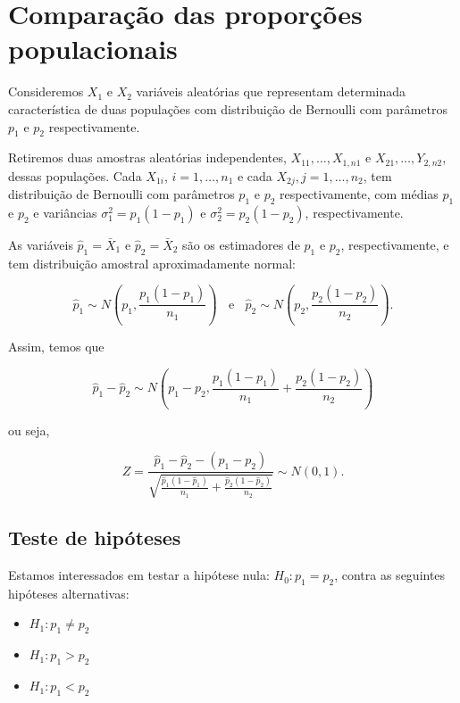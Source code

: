 \documentclass[
]{book}
\providecommand{\tightlist}{%
  \setlength{\itemsep}{0pt}\setlength{\parskip}{0pt}}
\begin{document}
\hypertarget{comparauxe7uxe3o-das-proporuxe7uxf5es-populacionais}{%
\section{Comparação das proporções populacionais}\label{comparauxe7uxe3o-das-proporuxe7uxf5es-populacionais}}

Consideremos \(X_1\) e \(X_2\) variáveis aleatórias que representam determinada característica de duas populações com distribuição de Bernoulli com parâmetros \(p_1\) e \(p_2\) respectivamente.

Retiremos duas amostras aleatórias independentes, \(X_{11},\ldots,X_{1,n1}\) e \(X_{21},\ldots,Y_{2,n2}\), dessas populações. Cada \(X_{1i}\), \(i=1,\ldots,n_1\) e cada \(X_{2j}, j=1,\ldots,n_2\), tem distribuição de Bernoulli com parâmetros \(p_1\) e \(p_2\) respectivamente, com médias \(p_1\) e \(p_2\) e variâncias \(\sigma^2_1=p_1(1-p_1)\) e \(\sigma^2_2=p_2(1-p_2)\), respectivamente.

As variáveis \(\hat p_1=\bar X_1\) e \(\hat p_2=\bar X_2\) são os estimadores de \(p_1\) e \(p_2\), respectivamente, e tem distribuição amostral aproximadamente normal:

\[\hat p_1\sim N\left(p_1,\frac{p_1(1-p_1)}{n_1}\right)~~~~\text{e}~~~~\hat p_2\sim N\left(p_2,\frac{p_2(1-p_2)}{n_2}\right).\]

Assim, temos que

\[\hat p_1-\hat p_2\sim N\left(p_1-p_2,\frac{p_1(1-p_1)}{n_1}+\frac{p_2(1-p_2)}{n_2}\right)\]

ou seja,

\[Z=\frac{\hat p_1-\hat p_2 - (p_1-p_2)}{\sqrt{\frac{\hat p_1(1-\hat p_1)}{n_1}+\frac{\hat p_2(1-\hat p_2)}{n_2}}}\sim N(0,1).\]

\hypertarget{teste-de-hipuxf3teses-3}{%
\subsection{Teste de hipóteses}\label{teste-de-hipuxf3teses-3}}

Estamos interessados em testar a hipótese nula: \(H_0: p_1=p_2\), contra as seguintes hipóteses alternativas:

\begin{itemize}
\tightlist
\item
  \(H_1: p_1\ne p_2\)
\item
  \(H_1: p_1>p_2\)
\item
  \(H_1: p_1<p_2\)
\end{itemize}
\end{document}

